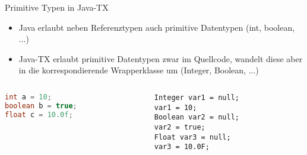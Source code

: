 \documentclass{beamer}
\begin{document}
\begin{frame}[fragile]{Primitive Typen in Java-TX}
    \begin{itemize}
        \item Java erlaubt neben Referenztypen auch primitive Datentypen (int, boolean, ...)
        \item Java-TX erlaubt primitive Datentypen zwar im Quellcode, wandelt diese aber in die korrespondierende Wrapperklasse um (Integer, Boolean, ...)
    \end{itemize}

    \begin{columns}
        \begin{column}{0.5\textwidth}
            \begin{lstlisting}[language=java]
int a = 10; 
boolean b = true;
float c = 10.0f;
            \end{lstlisting}
        \end{column}
        \begin{column}{0.5\textwidth}
            \begin{lstlisting}
Integer var1 = null;
var1 = 10;
Boolean var2 = null;
var2 = true;
Float var3 = null;
var3 = 10.0F;
            \end{lstlisting}
        \end{column}
    \end{columns}
\end{frame}

\begin{frame}[fragile]

\end{frame}
\end{document}
